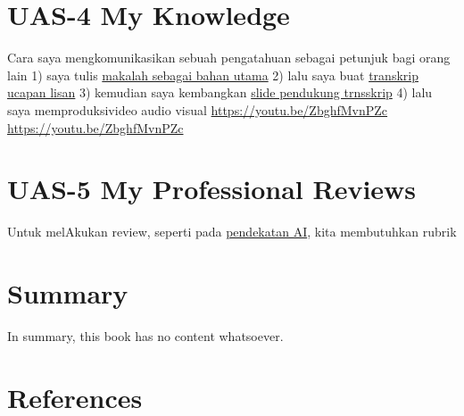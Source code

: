 \documentclass[
  letterpaper,
  DIV=11,
  numbers=noendperiod]{scrreprt}
\begin{document}
\chapter{UAS-4 My Knowledge}\label{uas-4-my-knowledge}

Cara saya mengkomunikasikan sebuah pengatahuan sebagai petunjuk bagi
orang lain 1) saya tulis
\href{Rekomendasi\%20Presentasi\%20Efektif(Contoh\%20Makalah).pdf}{makalah
sebagai bahan utama} 2) lalu saya buat
\href{Contoh\%20Transkrip\%20Presentasi.pdf}{transkrip ucapan lisan} 3)
kemudian saya kembangkan
\href{Rekomendasi\%20Presentasi\%20(Contoh\%20Slides).pdf}{slide
pendukung trnsskrip} 4) lalu saya memproduksivideo audio visual
\url{https://youtu.be/ZbghfMvnPZc} \url{https://youtu.be/ZbghfMvnPZc}


\chapter{UAS-5 My Professional
Reviews}\label{uas-5-my-professional-reviews}

Untuk melAkukan review, seperti pada
\href{../My_Personal_Reviews/Doc.5.Mengevaluasi-Esai-Berdasarkan-Rubrik.pdf}{pendekatan
AI}, kita membutuhkan rubrik


\chapter{Summary}\label{summary}

In summary, this book has no content whatsoever.


\chapter*{References}\label{references}


\label{refs}
\end{document}
